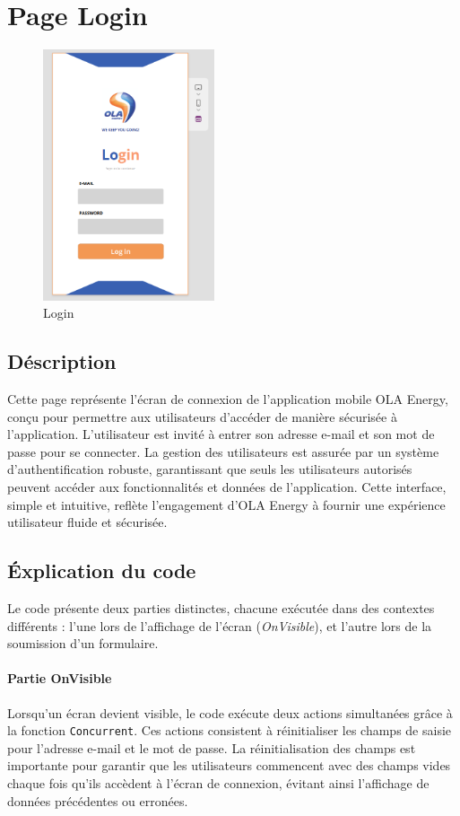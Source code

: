 \documentclass[a4paper, oneside, 12pt, final]{extreport}
\begin{document}
\section{Page Login}
\begin{figure}[h]
    \centering
    \includegraphics[width=0.45\textwidth]{Login.png} %
    \caption{Login}
    \label{fig:Login}
\end{figure}
\subsection{Déscription}
Cette page représente l'écran de connexion de l'application mobile OLA Energy, conçu pour permettre aux utilisateurs d'accéder de manière sécurisée à l'application. L'utilisateur est invité à entrer son adresse e-mail et son mot de passe pour se connecter. La gestion des utilisateurs est assurée par un système d'authentification robuste, garantissant que seuls les utilisateurs autorisés peuvent accéder aux fonctionnalités et données de l'application. Cette interface, simple et intuitive, reflète l'engagement d'OLA Energy à fournir une expérience utilisateur fluide et sécurisée.
\subsection{Éxplication du code}
Le code présente deux parties distinctes, chacune exécutée dans des contextes différents : l'une lors de l'affichage de l'écran (\textit{OnVisible}), et l'autre lors de la soumission d'un formulaire.

\paragraph{Partie OnVisible}
Lorsqu'un écran devient visible, le code exécute deux actions simultanées grâce à la fonction \texttt{Concurrent}. Ces actions consistent à réinitialiser les champs de saisie pour l'adresse e-mail et le mot de passe. La réinitialisation des champs est importante pour garantir que les utilisateurs commencent avec des champs vides chaque fois qu'ils accèdent à l'écran de connexion, évitant ainsi l'affichage de données précédentes ou erronées.
\end{document}
